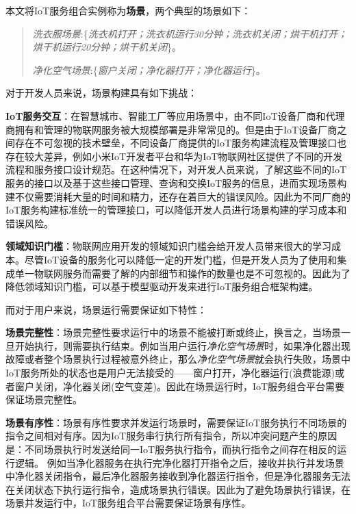 \documentclass[winfonts,master,twoside]{njuthesis}
\begin{document}
本文将IoT服务组合实例称为\textbf{场景}\cite{DBLP:journals/fgcs/ArellanesL20}，两个典型的场景如下：

\begin{quote}
\textit{洗衣服场景}:\{\emph{洗衣机打开；洗衣机运行30分钟；洗衣机关闭；烘干机打开；烘干机运行20分钟；烘干机关闭}\}。

\textit{净化空气场景}:\{\emph{窗户关闭；净化器打开；净化器运行}\}。
\end{quote}

对于开发人员来说，场景构建具有如下挑战：

\textbf{IoT服务交互}：在智慧城市、智能工厂等应用场景中，由不同IoT设备厂商和代理商拥有和管理的物联网服务被大规模部署是非常常见的。但是由于IoT设备厂商之间存在不可忽视的技术壁垒，不同设备厂商提供的IoT服务构建流程及管理接口也存在较大差异，例如小米IoT开发者平台\cite{xiaomiiot}和华为IoT物联网社区\cite{huaweiiot}提供了不同的开发流程和服务接口设计规范。在这种情况下，对开发人员来说，了解这些不同的IoT服务的接口以及基于这些接口管理、查询和交换IoT服务的信息，进而实现场景构建不仅需要消耗大量的时间和精力，还存在着巨大的错误风险。因此为不同厂商的IoT服务构建标准统一的管理接口，可以降低开发人员进行场景构建的学习成本和错误风险。

\textbf{领域知识门槛}：物联网应用开发的领域知识门槛会给开发人员带来很大的学习成本。尽管IoT设备的服务化可以降低一定的开发门槛，但是开发人员为了使用和集成单一物联网服务而需要了解的内部细节和操作的数量也是不可忽视的。因此为了降低领域知识门槛，可以基于模型驱动开发来进行IoT服务组合框架构建。


而对于用户来说，场景运行需要保证如下特性：

\textbf{场景完整性}：场景完整性要求运行中的场景不能被打断或终止，换言之，当场景一旦开始执行，则需要执行结束\cite{zave2015toward}。例如当用户运行\textit{净化空气场景}时，如果净化器出现故障或者整个场景执行过程被意外终止，那么\textit{净化空气场景}就会执行失败，场景中IoT服务所处的状态也是用户无法接受的——窗户打开，净化器运行(浪费能源)或者窗户关闭，净化器关闭(空气变差)。因此在场景运行时，IoT服务组合平台需要保证场景完整性。

\textbf{场景有序性}：场景有序性要求并发运行场景时，需要保证IoT服务执行不同场景的指令之间相对有序\cite{leesatapornwongsa2020transactuations}。因为IoT服务串行执行所有指令，所以冲突问题产生的原因是：不同场景执行时发送给同一IoT服务执行指令，而执行指令之间存在相反的运行逻辑。
例如当净化器服务在执行完净化器打开指令之后，接收并执行并发场景中净化器关闭指令，最后净化器服务接收到净化器运行指令，但是净化器服务无法在关闭状态下执行运行指令，造成场景执行错误。因此为了避免场景执行错误，在场景并发运行中，IoT服务组合平台需要保证场景有序性。 
\end{document}
